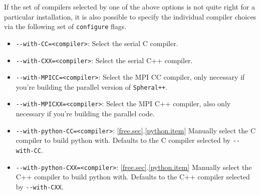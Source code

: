 \documentclass{article}
\newcommand{\Spheral}{{\tt Spheral++}}
\begin{document}
If the set of compilers selected by one of the above options is not quite right
for a particular installation, it is also possible to specify the individual
compiler choices via the following set of {\tt configure} flags.
\begin{itemize}
\item \verb+--with-CC=<compiler>+: Select the serial C compiler.
\item \verb+--with-CXX=<compiler>+: Select the serial C++ compiler.
\item \verb+--with-MPICC=<compiler>+: Select the MPI CC compiler, only necessary
if you're building the parallel version of \Spheral.
\item \verb+--with-MPICXX=<compiler>+: Select the MPI C++ compiler, also only
necessary if you're building the parallel code.
\item \verb+--with-python-CC=<compiler>+: \ref{free.sec}.\ref{python.item}
 Manually select the C compiler to build python with.  Defaults to the
 C compiler selected by \verb+--with-CC+.
\item \verb+--with-python-CXX=<compiler>+: \ref{free.sec}.\ref{python.item}
Manually select the C++ compiler to build python with.  Defaults to
the C++ compiler selected by \verb+--with-CXX+.
\end{itemize}
\end{document}

